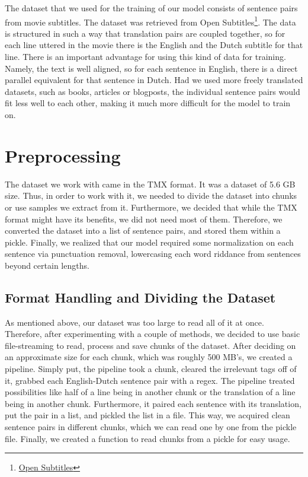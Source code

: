 \documentclass[11pt]{article}
\begin{document}
The dataset that we used for the training of our model consists of sentence pairs from movie subtitles. The dataset was retrieved from Open Subtitles\footnote[2]{\href{http://opus.nlpl.eu/OpenSubtitles-v2018.php}{Open Subtitles}}. The data is structured in such a way that translation pairs are coupled together, so for each line uttered in the movie there is the English and the Dutch subtitle for that line. There is an important advantage for using this kind of data for training. Namely, the text is well aligned, so for each sentence in English, there is a direct parallel equivalent for that sentence in Dutch. Had we used more freely translated datasets, such as books, articles or blogposts, the individual sentence pairs would fit less well to each other, making it much more difficult for the model to train on.

\section{Preprocessing}
The dataset we work with came in the TMX format. It was a dataset of 5.6 GB size. Thus, in order to work with it, we needed to divide the dataset into chunks or use samples we extract from it. Furthermore, we decided that while the TMX format might have its benefits, we did not need most of them. Therefore, we converted the dataset into a list of sentence pairs, and stored them within a pickle. Finally, we realized that our model required some normalization on each sentence via punctuation removal, lowercasing each word riddance from sentences beyond certain lengths.

\subsection{Format Handling and Dividing the Dataset}
As mentioned above, our dataset was too large to read all of it at once. Therefore, after experimenting with a couple of methods, we decided to use basic file-streaming to read, process and save chunks of the dataset. After deciding on an approximate size for each chunk, which was roughly 500 MB's, we created a pipeline. Simply put, the pipeline took a chunk, cleared the irrelevant tags off of it, grabbed each English-Dutch sentence pair with a regex. The pipeline treated possibilities like half of a line being in another chunk or the translation of a line being in another chunk. Furthermore, it paired each sentence with its translation, put the pair in a list, and pickled the list in a file. This way, we acquired clean sentence pairs in different chunks, which we can read one by one from the pickle file. Finally, we created a function to read chunks from a pickle for easy usage.
\end{document}
